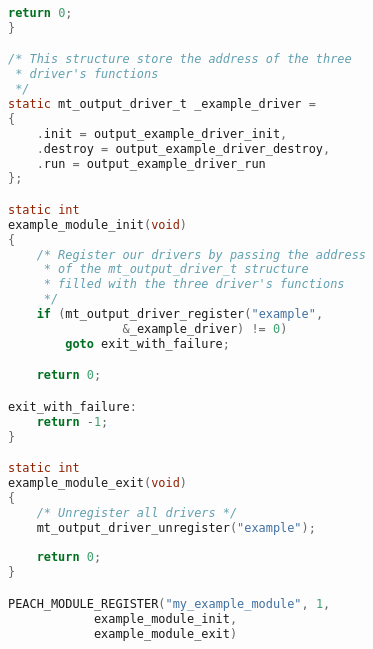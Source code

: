 \begin{lstlisting}[language=C,
caption=Complete Output \& Module example]
    return 0;
}

/* This structure store the address of the three
 * driver's functions
 */
static mt_output_driver_t _example_driver =
{
    .init = output_example_driver_init,
    .destroy = output_example_driver_destroy,
    .run = output_example_driver_run
};

static int
example_module_init(void)
{
    /* Register our drivers by passing the address
     * of the mt_output_driver_t structure
     * filled with the three driver's functions 
     */
    if (mt_output_driver_register("example", 
                &_example_driver) != 0) 
        goto exit_with_failure;

    return 0;

exit_with_failure:
    return -1;
}

static int
example_module_exit(void)
{
    /* Unregister all drivers */
    mt_output_driver_unregister("example");
    
    return 0;
}

PEACH_MODULE_REGISTER("my_example_module", 1,
            example_module_init,
            example_module_exit)

\end{lstlisting}
